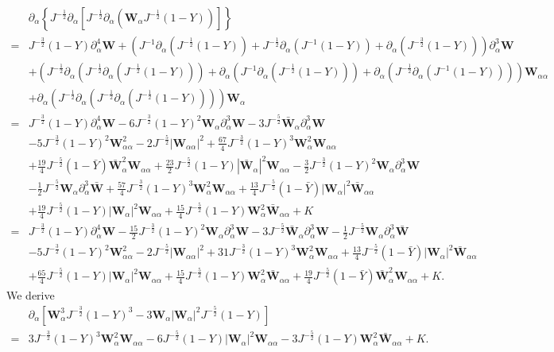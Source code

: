 \documentclass[10pt]{amsart}
\theoremstyle{remark}
\theoremstyle{definition}
\numberwithin{equation}{section}
\newcommand{\p}{\partial}
\newcommand{\al}{\alpha}
\newcommand{\f}{\frac}
\newcommand{\bw}{\mathbf{W}}
\begin{document}
\begin{align*}
&\p_\al\left\{J^{-\f12}\p_\al\left[J^{-\f12}\p_\al\left(\mathbf{W}_{\al}J^{-\f12}(1-Y)\right)\right]\right\}\\
=&J^{-\f32}(1-Y)\p^4_{\al}\bw+\left(J^{-1}\p_{\al}(J^{-\f12}(1-Y))+J^{-\f12}\p_{\al}(J^{-1}(1-Y))+\p_{\al}(J^{-\f32}(1-Y))\right)\p^3_{\al}\bw\\
&+\left(J^{-\f12}\p_{\al}(J^{-\f12}\p_{\al}(J^{-\f12}(1-Y)))+\p_{\al}(J^{-1}\p_{\al}(J^{-\f12}(1-Y)))+\p_{\al}(J^{-\f12}\p_{\al}(J^{-1}(1-Y)))\right)\bw_{\al\al}\\
&+\p_{\al}\left(J^{-\f12}\p_{\al}\left(J^{-\f12}\p_{\al}\left(J^{-\f12}(1-Y)\right)\right)\right)\bw_{\al}\\
=&J^{-\f32}(1-Y)\p^4_{\al}\bw-6J^{-\f32}(1-Y)^2\bw_{\al}\p^3_{\al}\bw-3 J^{-\f52}\bar{\bw}_{\al}\p^3_{\al}\bw\\
&-5J^{-\f32}(1-Y)^2\bw^2_{\al\al}-2 J^{-\f52}
|\bw_{\al\al}|^2+\f{67}{4}J^{-\f32}(1-Y)^3\bw_{\al}^2\bw_{\al\al}\\
&+\f{19}{4}J^{-\f52}(1-\bar{Y})\bar{\bw}_{\al}^2\bw_{\al\al}
+\f{23}{2}J^{-\f52}(1-Y)|\bar{\bw}_{\al}|^2\bw_{\al\al}-\f32 J^{-\f32}(1-Y)^2\bw_{\al}\p^3_{\al}\bw\\
&-\f12 J^{-\f52}\bw_{\al}\p^3_{\al}\bar{\bw}+\f{57}{4}J^{-\f32}(1-Y)^3\bw^2_{\al}\bw_{\al\al}+\f{13}{4}J^{-\f52}(1-\bar{Y})|\bw_{\al}|^2\bar{\bw}_{\al\al}\\
&+\f{19}{4}J^{-\f52}(1-Y)|\bw_{\al}|^2\bw_{\al\al}+\f{15}{4}J^{-\f52}(1-Y)\bw^2_\al\bar{\bw}_{\al\al}+K\\
=&J^{-\f32}(1-Y)\p^4_{\al}\bw-\f{15}{2}J^{-\f32}(1-Y)^2\bw_{\al}\p^3_{\al}\bw-3 J^{-\f52}\bar{\bw}_{\al}\p^3_{\al}\bw-\f12 J^{-\f52}
\bw_{\al}\p^3_{\al}\bar{\bw}\\
&-5J^{-\f32}(1-Y)^2\bw^2_{\al\al}-2 J^{-\f52}
|\bw_{\al\al}|^2+31J^{-\f32}(1-Y)^3\bw_{\al}^2\bw_{\al\al}+\f{13}{4}J^{-\f52}(1-\bar{Y})|\bw_{\al}|^2\bar{\bw}_{\al\al}\\
&+\f{65}{4}J^{-\f52}(1-Y)|\bw_{\al}|^2\bw_{\al\al}+\f{15}{4}J^{-\f52}(1-Y)\bw^2_\al\bar{\bw}_{\al\al}+\f{19}{4}J^{-\f52}(1-\bar{Y})\bar{\bw}_{\al}^2\bw_{\al\al}+K.
\end{align*}
We derive
\begin{align*}
&\p_\al\left[\mathbf{W}^3_{\al}J^{-\f32}(1-Y)^3-3\mathbf{W}_{\al}|\mathbf{W}_{\al}|^2 J^{-\f52}(1-Y)\right]\\
=&3J^{-\f32}(1-Y)^3\bw_{\al}^2\bw_{\al\al}-6J^{-\f52}(1-Y)|\bw_{\al}|^2\bw_{\al\al}-3J^{-\f52}(1-Y)\bw_{\al}^2\bar{\bw}_{\al\al}+K.
\end{align*}
\end{document}
